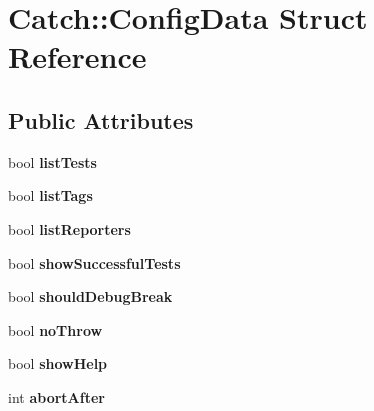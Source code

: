 \hypertarget{struct_catch_1_1_config_data}{\section{Catch\-:\-:Config\-Data Struct Reference}
\label{struct_catch_1_1_config_data}
}
\subsection*{Public Attributes}
\begin{DoxyCompactItemize}
\item 
\hypertarget{struct_catch_1_1_config_data_a0da0f6d493ef8f799273b4358d420a3a}{bool {\bfseries list\-Tests}}\label{struct_catch_1_1_config_data_a0da0f6d493ef8f799273b4358d420a3a}

\item 
\hypertarget{struct_catch_1_1_config_data_af780422bdef8d8b905204542855cf6b3}{bool {\bfseries list\-Tags}}\label{struct_catch_1_1_config_data_af780422bdef8d8b905204542855cf6b3}

\item 
\hypertarget{struct_catch_1_1_config_data_a4ba3618cae31b43237724f55359bfe95}{bool {\bfseries list\-Reporters}}\label{struct_catch_1_1_config_data_a4ba3618cae31b43237724f55359bfe95}

\item 
\hypertarget{struct_catch_1_1_config_data_aeb091ca2df2c654caaa2ad29c14578e5}{bool {\bfseries show\-Successful\-Tests}}\label{struct_catch_1_1_config_data_aeb091ca2df2c654caaa2ad29c14578e5}

\item 
\hypertarget{struct_catch_1_1_config_data_afec8310b1904784edb292e143a602fba}{bool {\bfseries should\-Debug\-Break}}\label{struct_catch_1_1_config_data_afec8310b1904784edb292e143a602fba}

\item 
\hypertarget{struct_catch_1_1_config_data_a6dd23f8c9d9337f46187e7dbb6a8328e}{bool {\bfseries no\-Throw}}\label{struct_catch_1_1_config_data_a6dd23f8c9d9337f46187e7dbb6a8328e}

\item 
\hypertarget{struct_catch_1_1_config_data_a12535241547dfc57e6864c4fc2cd4dd9}{bool {\bfseries show\-Help}}\label{struct_catch_1_1_config_data_a12535241547dfc57e6864c4fc2cd4dd9}

\item 
\hypertarget{struct_catch_1_1_config_data_a2d5505751aab745d5ae5e4ffe5c92c35}{int {\bfseries abort\-After}}\label{struct_catch_1_1_config_data_a2d5505751aab745d5ae5e4ffe5c92c35}


\end{DoxyCompactItemize}

